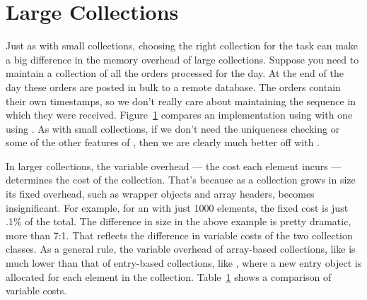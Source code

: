 





\section{Large Collections}

Just as with small collections, choosing the right collection for the task
can make a big difference in the memory overhead of large collections.  Suppose
you need to maintain a collection of all the orders processed for the day.  At
the end of the day these orders are posted in bulk to a remote database. The orders
contain their own timestamps, so we don't really care about maintaining the
sequence in which they were received. Figure~\ref{} compares an implementation
using  with one using . As with small
collections, if we don't need the uniqueness checking or some of the other features of , 
then we are clearly much better off with .

In larger collections, the variable overhead --- the cost each
element incurs --- determines the cost of the collection. That's because as a
collection grows in size its fixed overhead, such as wrapper objects and array
headers, becomes insignificant.  For example, for an  with just
1000 elements, the fixed cost is just .1\% of the total.  
The difference in size in the above example
is pretty dramatic, more than 7:1. That reflects the difference in variable costs of the two collection classes. 
As a general rule, the variable overhead of array-based collections, like
 is much lower than that of entry-based collections, like , where a new entry
object is allocated for each element in the collection. Table~\ref{} shows a
comparison of variable costs.


